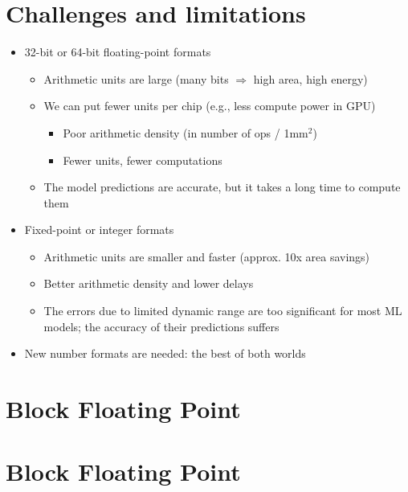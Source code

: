 \documentclass[12pt,openany, tikz,border=10pt]{book}
\begin{document}
			      	\section{Challenges and limitations}
			      	\begin{itemize}
			      		\item[] 32-bit or 64-bit floating-point formats
			      		      \begin{itemize}
			      		      	\item[] Arithmetic units are large (many bits $\Rightarrow$ high area, high energy)
			      		      	\item[] We can put fewer units per chip (e.g., less compute power in GPU)
			      		      	      \begin{itemize}
			      		      	      	\item[] Poor arithmetic density (in number of ops / 1mm$^2$)
			      		      	      	\item[] Fewer units, fewer computations
			      		      	      \end{itemize}
			      		      	\item[] The model predictions are accurate, but it takes a long time to compute them
			      		      \end{itemize}
			      		\item[] Fixed-point or integer formats
			      		      \begin{itemize}
			      		      	\item[] Arithmetic units are smaller and faster (approx. 10x area savings)
			      		      	\item[] Better arithmetic density and lower delays
			      		      	\item[] The errors due to limited dynamic range are too significant for most ML models; the accuracy of their predictions suffers
			      		      \end{itemize}
			      		\item[] New number formats are needed: the best of both worlds
			      	\end{itemize}
			      	
			      	
			      	
			      	\section{Block Floating Point}
			      	\section*{Block Floating Point}
			      	
\end{document}
